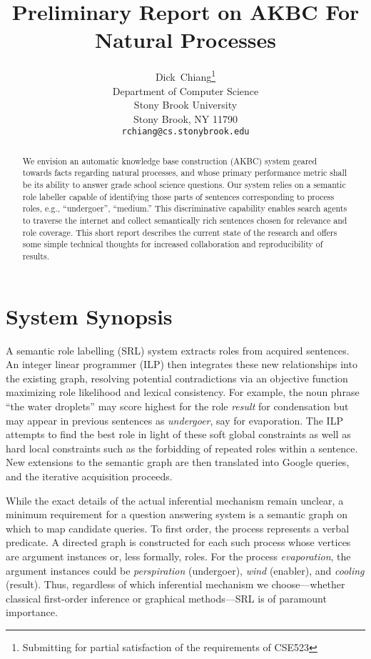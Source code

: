 \documentclass{article} %
\title{Preliminary Report on AKBC For Natural Processes}
\author{
Dick~Chiang\thanks{Submitting for partial satisfaction of the requirements of CSE523}\\
Department of Computer Science\\
Stony Brook University\\
Stony Brook, NY 11790 \\
\texttt{rchiang@cs.stonybrook.edu} \\
}
\begin{document}
\maketitle

\begin{abstract}
We envision an automatic knowledge base construction (AKBC) system geared towards facts regarding natural processes, and whose primary performance metric shall be its ability to answer grade school science questions.  Our system relies on a semantic role labeller capable of identifying those parts of sentences corresponding to process roles, e.g., ``undergoer'', ``medium.''  This discriminative capability enables search agents to traverse the internet and collect semantically rich sentences chosen for relevance and role coverage.  This short report describes the current state of the research and offers some simple technical thoughts for increased collaboration and reproducibility of results.
\end{abstract}

\section{System Synopsis}
A semantic role labelling (SRL) system extracts roles from acquired sentences.  An integer linear programmer (ILP) then integrates these new relationships into the existing graph, resolving potential contradictions via an objective function maximizing role likelihood and lexical consistency.  For example, the noun phrase ``the water droplets'' may score highest for the role {\it result} for condensation but may appear in previous sentences as {\it undergoer}, say for evaporation.   The ILP attempts to find the best role in light of these soft global constraints as well as hard local constraints such as the forbidding of repeated roles within a sentence.  New extensions to the semantic graph are then translated into Google queries, and the iterative acquisition proceeds.

While the exact details of the actual inferential mechanism remain unclear, a minimum requirement for a question answering system is a semantic graph on which to map candidate queries.  To first order, the process represents a verbal predicate.  A directed graph is constructed for each such process whose vertices are argument instances or, less formally, roles.  For the process {\it evaporation}, the argument instances could be {\it perspiration} (undergoer), {\it wind} (enabler), and {\it cooling} (result).  Thus, regardless of which inferential mechanism we choose---whether classical first-order inference or graphical methods---SRL is of paramount importance.
\end{document}
